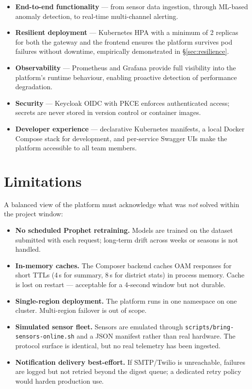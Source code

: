 \documentclass[12pt,a4paper,oneside]{report}
\begin{document}
\begin{itemize}
  \item \textbf{End-to-end functionality} — from sensor data ingestion, through ML-based anomaly detection, to real-time multi-channel alerting.
  \item \textbf{Resilient deployment} — Kubernetes HPA with a minimum of 2 replicas for both the gateway and the frontend ensures the platform survives pod failures without downtime, empirically demonstrated in §\ref{sec:resilience}.
  \item \textbf{Observability} — Prometheus and Grafana provide full visibility into the platform's runtime behaviour, enabling proactive detection of performance degradation.
  \item \textbf{Security} — Keycloak OIDC with PKCE enforces authenticated access; secrets are never stored in version control or container images.
  \item \textbf{Developer experience} — declarative Kubernetes manifests, a local Docker Compose stack for development, and per-service Swagger UIs make the platform accessible to all team members.
\end{itemize}

\section{Limitations}

A balanced view of the platform must acknowledge what was \emph{not} solved within the project window:

\begin{itemize}
  \item \textbf{No scheduled Prophet retraining.} Models are trained on the dataset submitted with each request; long-term drift across weeks or seasons is not handled.
  \item \textbf{In-memory caches.} The Composer backend caches OAM responses for short TTLs (4\,s for summary, 8\,s for district stats) in process memory. Cache is lost on restart — acceptable for a 4-second window but not durable.
  \item \textbf{Single-region deployment.} The platform runs in one namespace on one cluster. Multi-region failover is out of scope.
  \item \textbf{Simulated sensor fleet.} Sensors are emulated through \texttt{scripts/bring-sensors-online.sh} and a JSON manifest rather than real hardware. The protocol surface is identical, but no real telemetry has been ingested.
  \item \textbf{Notification delivery best-effort.} If SMTP/Twilio is unreachable, failures are logged but not retried beyond the digest queue; a dedicated retry policy would harden production use.
\end{itemize}
\end{document}
